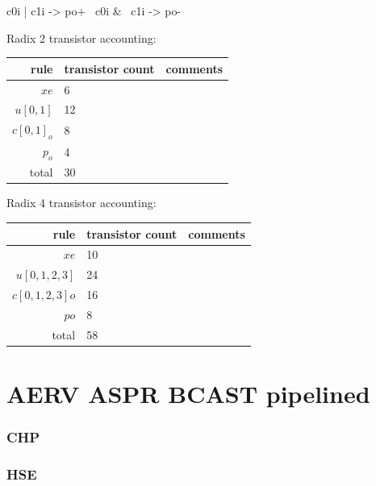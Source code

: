 \documentclass{article}
\begin{document}
\begin{prs2}
c0i | c1i -> po+
~c0i & ~c1i -> po-
\end{prs2}

\noindent
Radix 2 transistor accounting:

\begin{center}
    \begin{tabular}{|r|l|l|}
    \hline
    rule & transistor count & comments \\ \hline
    $xe$ & 6 & \\ \hline
    $u[0,1]$ & 12 & \\ \hline
    $c[0,1]_o$ & 8 & \\ \hline
    $p_o$ & 4 & \\ \hline
    \hline total & 30 & \\ \hline
    \end{tabular}
\end{center}

\noindent
Radix 4 transistor accounting:

\begin{center}
    \begin{tabular}{|r|l|l|}
    \hline
    rule & transistor count & comments \\ \hline
    $xe$ & 10 & \\ \hline
    $u[0,1,2,3]$ & 24 & \\ \hline
    $c[0,1,2,3]o$ & 16 & \\ \hline
    $po$ & 8 & \\ \hline
    \hline total & 58 & \\ \hline
    \end{tabular}
\end{center}

\section{AERV ASPR BCAST pipelined \label{sec:AERV_ASPR_BCAST_p}}

\subsubsection*{CHP}

\subsubsection*{HSE}
\end{document}
